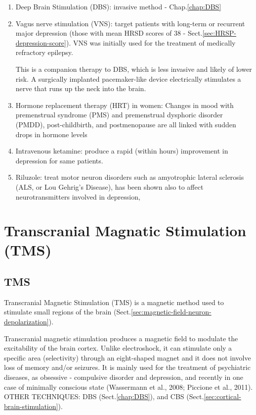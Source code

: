 \begin{enumerate}
  \item Deep Brain Stimulation (DBS): invasive method - Chap.\ref{chap:DBS}
  
  \item Vagus nerve stimulation (VNS): target patients with long-term or
  recurrent major depression (those with mean HRSD scores of 38 -
  Sect.\ref{sec:HRSP-depression-score}).
  VNS was initially used for the treatment of medically refractory epilepsy.
  
  This is a companion therapy to DBS, which is less invasive
and likely of lower risk. A surgically implanted pacemaker-like device
electrically stimulates a  nerve that runs up the neck into the brain.
  
  \item Hormone replacement therapy (HRT) in women: 
  Changes in mood with premenstrual syndrome (PMS) and premenstrual dysphoric
  disorder (PMDD), post-childbirth, and postmenopause are all linked with sudden
  drops in hormone levels 
  
  \item Intravenous ketamine: produce a rapid (within hours) improvement in
  depression for same patients.
  
  \item Riluzole: treat motor neuron disorders such as amyotrophic lateral
  sclerosis (ALS, or Lou Gehrig's Disease), has been shown also to affect
  neurotransmitters involved in depression,  
  
\end{enumerate}


\chapter{Transcranial Magnatic Stimulation (TMS)}
\label{chap:TMS}

\section{TMS}
\label{sec:TMS}

Transcranial Magnetic Stimulation (TMS)  is a magnetic method used to stimulate
small regions of the brain
(Sect.\ref{sec:magnetic-field-neuron-depolarization}).

Transcranial magnetic stimulation produces a magnetic field to modulate the
excitability of the brain cortex. Unlike electroshock, it can stimulate only a
specific area (selectivity) through an eight-shaped magnet and it does not
involve loss of memory and/or seizures. It is mainly used for the treatment of
psychiatric diseases, as obsessive - compulsive disorder and depression, and
recently in one case of minimally conscious state (Wassermann et al., 2008;
Piccione et al., 2011). OTHER TECHNIQUES: DBS (Sect.\ref{chap:DBS}), and CBS
(Sect.\ref{sec:cortical-brain-stimulation}).

